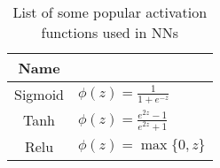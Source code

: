 \begin{table}[H]
    \centering
    \begin{tabular}{|c|l|}
        \hline
        \rowcolor[HTML]{6638B6}
        {\color[HTML]{FFFFFF} Name} & \multicolumn{1}{c|}{\cellcolor[HTML]{6638B6}{\color[HTML]{FFFFFF} Formula}} \\ \hline
        Sigmoid                     & $\phi(z)=\frac{1}{1+e^{-z}}$                                                \\ \hline
        Tanh                        & $\phi(z)=\frac{e^{2z}-1}{e^{2z}+1}$                                         \\ \hline
        Relu                        & $\phi(z)=\max\{0,z\}$                                                       \\ \hline
    \end{tabular}
    \caption{List of some popular activation functions used in \acp{NN}}
    \label{tab:activation_functions}
\end{table}